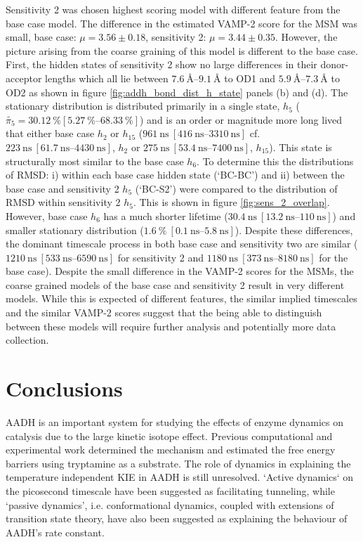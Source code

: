 Sensitivity 2 was chosen highest scoring model with different feature from the base case model.  The difference in the estimated VAMP-2 score for the MSM was small, base case: $\mu=3.56 \pm 0.18$, sensitivity 2: $\mu=3.44 \pm 0.35$. However, the picture arising from the coarse graining of this model is different to the base case.  First, the hidden states of sensitivity 2 show no large differences in their donor-acceptor lengths which all lie between $\SIrange{7.6}{9.1}{\angstrom}$ to OD1 and $\SIrange{5.9}{7.3}{\angstrom}$ to OD2 as shown in figure \ref{fig:addh_bond_dist_h_state} panels (b) and (d). The stationary distribution is distributed primarily in a single state, $h_{5}$ ($\tilde{\pi_{5}} = \SI{30.12}{\percent} [\SIrange{5.27}{68.33}{\percent}]$) and is an order or magnitude more long lived that either base case $h_{2}$ or $h_{15}$ ($\SI{961}{\nano\second}\ [\SIrange{416}{3310}{\nano\second}]$ cf. $\SI{223}{\nano\second}\ [\SIrange{61.7}{4430}{\nano\second}]$, $h_{2}$ or $\SI{275}{\nano\second}\ [\SIrange{53.4}{7400}{\nano\second}]$, $h_{15}$). This state is structurally most similar to the base case $h_{6}$. To determine this  the distributions of RMSD: i) within each base case hidden state (`BC-BC') and ii)  between the base case and sensitivity 2 $h_{5}$ (`BC-S2') were compared to the distribution of RMSD within sensitivity 2 $h_{5}$. This is shown in figure \ref{fig:sens_2_overlap}. However, base case $h_{6}$ has a much shorter lifetime ($\SI{30.4}{\nano\second}\ [\SIrange{13.2}{110}{\nano\second}]$) and smaller stationary distribution ($\SI{1.6}{\percent}\ [\SIrange{0.1}{5.8}{\nano\second}]$). Despite these differences, the dominant timescale process in both base case and sensitivity two are similar ($\SI{1210}{\nano\second}\ [\SIrange{533}{6590}{\nano\second}]$ for sensitivity 2 and  $\SI{1180}{\nano\second}\ [\SIrange{373}{8180}{\nano\second}]$ for the base case). Despite the small difference in the VAMP-2 scores for the MSMs, the coarse grained models of the base case and sensitivity 2 result in very different models. While this is expected of different features, the similar implied timescales  and the similar VAMP-2 scores suggest that the being able to distinguish between these models will require further analysis and potentially more data collection. 


\section{Conclusions}\label{sec:aadh_conclusions}
AADH is an important system for studying the effects of enzyme dynamics on catalysis due to the large kinetic isotope effect. Previous computational and experimental work determined the mechanism and estimated the free energy barriers using tryptamine as a substrate. The role of dynamics in explaining the temperature independent KIE in AADH is still unresolved. `Active dynamics` on the picosecond timescale have been suggested as facilitating tunneling, while  `passive dynamics', i.e. conformational dynamics, coupled with extensions of transition state theory, have also been suggested as explaining the behaviour of AADH's rate constant. 

